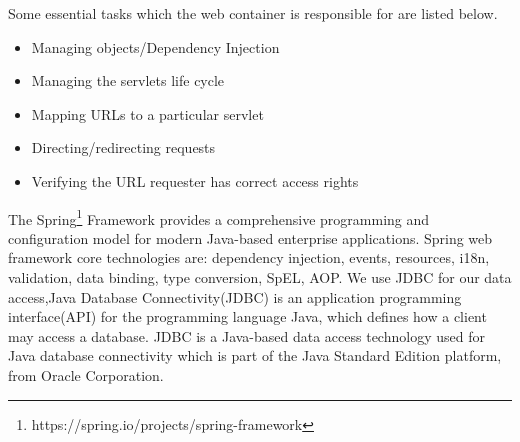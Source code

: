 Some essential tasks which the web container is responsible for are listed below.
\begin{itemize}
  \item Managing objects/Dependency Injection
  \item Managing the servlets life cycle
  \item Mapping URLs to a particular servlet
  \item Directing/redirecting requests
  \item Verifying the URL requester has correct access rights 
\end{itemize}
The Spring\footnote{https://spring.io/projects/spring-framework} Framework provides a comprehensive programming and configuration model for modern Java-based enterprise applications.
Spring web framework core technologies are:
dependency injection, events, resources, i18n, validation, data binding, type conversion, SpEL, AOP.
We use JDBC for our data access,Java Database Connectivity(JDBC) is an application programming interface(API) for the programming language Java, which defines how a client may access a database. JDBC is a Java-based data access technology used for Java database connectivity which is part of the Java Standard Edition platform, from Oracle Corporation.




